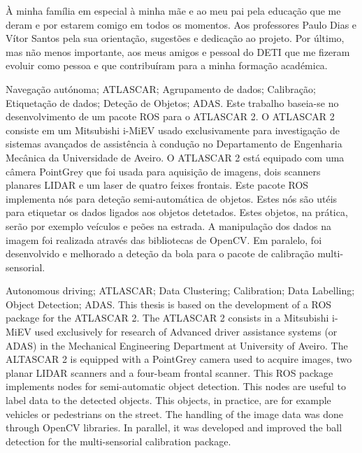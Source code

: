 \documentclass[11pt,twoside,a4paper]{report}
\begin{document}
\TitlePage
  \vspace*{55mm}
       {\`A minha fam\'ilia em especial \`a minha m\~ae e ao meu pai pela educa\c c\~ao que me deram e por estarem comigo em todos os momentos. Aos professores Paulo Dias e V\'itor Santos pela sua orienta\c c\~ ao, sugest\~oes e dedica\c c\~ ao ao projeto.}
  \TEXT{}
       {Por \'ultimo, mas n\~ao menos importante, aos meus amigos e pessoal do DETI que me fizeram evoluir como pessoa e que contribu\'iram para a minha forma\c c\~ ao acad\' emica.}
\EndTitlePage
\titlepage\ \endtitlepage %

\TitlePage
  \vspace*{55mm}
  {Navega{\c c}\~ao aut\'onoma; ATLASCAR; Agrupamento de dados; Calibra{\c c}\~ao; Etiqueta\c c\~ao de dados; Dete\c c\~ao de Objetos; ADAS.}
  \vspace*{5mm}
       {Este trabalho baseia-se no desenvolvimento de um pacote ROS para o ATLASCAR 2. O ATLASCAR 2 consiste em um Mitsubishi i-MiEV usado exclusivamente para investiga\c c\~ao de sistemas avan\c cados de assist\^encia \`a condu\c c\~ao no Departamento de Engenharia Mec\^anica da Universidade de Aveiro. O ATLASCAR 2 est\'a equipado com uma c\^amera PointGrey que foi usada para aquisi\c c\~ao de imagens, dois scanners planares LIDAR e um laser de quatro feixes frontais. Este pacote ROS implementa n\'os para dete\c c\~ao semi-autom\'atica de objetos. Estes n\'os s\~ao ut\'eis para etiquetar os dados ligados aos objetos detetados. Estes objetos, na pr\'atica, ser\~ao por exemplo ve\'iculos e pe\~oes na estrada. A manipula\c c\~ao dos dados na imagem foi realizada atrav\'es das bibliotecas de OpenCV. Em paralelo, foi desenvolvido e melhorado a dete\c c\~ao da bola para o pacote de calibra\c c\~ao multi-sensorial.
       	}
\EndTitlePage
\titlepage\ \endtitlepage %

\TitlePage
  \vspace*{55mm}
  {Autonomous driving; ATLASCAR; Data Clustering; Calibration; Data Labelling; Object Detection; ADAS.}
  \vspace*{5mm}
       {This thesis is based on the development of a ROS package for the ATLASCAR 2. The ATLASCAR 2 consists in a Mitsubishi i-MiEV used exclusively for research of Advanced driver assistance systems (or ADAS) in the Mechanical Engineering Department at University of Aveiro. The ALTASCAR 2 is equipped with a PointGrey camera used to acquire images, two planar LIDAR scanners and a four-beam frontal scanner. This ROS package implements nodes for semi-automatic object detection. This nodes are useful to label data to the detected objects. This objects, in practice, are for example vehicles or pedestrians on the street. The handling of the image data was done through OpenCV libraries. In parallel, it was developed and improved the ball detection for the multi-sensorial calibration package.
       	}
\EndTitlePage
\titlepage\ \endtitlepage %
\end{document}
